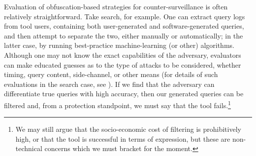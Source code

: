 \documentclass[conference]{IEEEtran}
\begin{document}
Evaluation of obfuscation-based strategies for counter-surveillance is often relatively straightforward. Take search, for example. One can extract query logs from tool users, containing both user-generated and software-generated queries, and then attempt to separate the two, either manually or automatically; in the latter case, by running best-practice machine-learning (or other) algorithms. Although one may not know the exact capabilities of the adversary, evaluators can make educated guesses as to the type of attacks to be considered, whether timing, query content, side-channel, or other means (for details of such evaluations in the search case, see \cite{Gervais}). If we find that the adversary can differentiate true queries with high accuracy, then our generated queries can be filtered and, from a protection standpoint, we must say that the tool fails.\footnote{We may still argue that the socio-economic cost of filtering is prohibitively high, or that the tool is successful in terms of expression, but these are non-technical concerns which we must bracket for the moment.}

\end{document}
